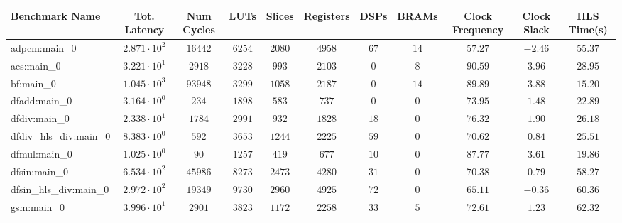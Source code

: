 \begin{tabular}{|l|c|c|c|c|c|c|c|c|c|c|}
\hline
Benchmark Name          & Tot. Latency           & Num Cycles & LUTs      & Slices    & Registers & DSPs    & BRAMs   & Clock Frequency & Clock Slack & HLS Time(s) \\
\hline
adpcm:main\_0           & $ 2.871 \cdot 10^{2} $ & $ 16442  $ & $ 6254  $ & $ 2080  $ & $ 4958  $ & $ 67  $ & $ 14  $ & $ 57.27       $ & $ -2.46   $ & $ 55.37   $ \\
aes:main\_0             & $ 3.221 \cdot 10^{1} $ & $ 2918   $ & $ 3228  $ & $ 993   $ & $ 2103  $ & $ 0   $ & $ 8   $ & $ 90.59       $ & $ 3.96    $ & $ 28.95   $ \\
bf:main\_0              & $ 1.045 \cdot 10^{3} $ & $ 93948  $ & $ 3299  $ & $ 1058  $ & $ 2187  $ & $ 0   $ & $ 14  $ & $ 89.89       $ & $ 3.88    $ & $ 15.20   $ \\
dfadd:main\_0           & $ 3.164 \cdot 10^{0} $ & $ 234    $ & $ 1898  $ & $ 583   $ & $ 737   $ & $ 0   $ & $ 0   $ & $ 73.95       $ & $ 1.48    $ & $ 22.89   $ \\
dfdiv:main\_0           & $ 2.338 \cdot 10^{1} $ & $ 1784   $ & $ 2991  $ & $ 932   $ & $ 1828  $ & $ 18  $ & $ 0   $ & $ 76.32       $ & $ 1.90    $ & $ 26.18   $ \\
dfdiv\_hls\_div:main\_0 & $ 8.383 \cdot 10^{0} $ & $ 592    $ & $ 3653  $ & $ 1244  $ & $ 2225  $ & $ 59  $ & $ 0   $ & $ 70.62       $ & $ 0.84    $ & $ 25.51   $ \\
dfmul:main\_0           & $ 1.025 \cdot 10^{0} $ & $ 90     $ & $ 1257  $ & $ 419   $ & $ 677   $ & $ 10  $ & $ 0   $ & $ 87.77       $ & $ 3.61    $ & $ 19.86   $ \\
dfsin:main\_0           & $ 6.534 \cdot 10^{2} $ & $ 45986  $ & $ 8273  $ & $ 2473  $ & $ 4280  $ & $ 31  $ & $ 0   $ & $ 70.38       $ & $ 0.79    $ & $ 58.27   $ \\
dfsin\_hls\_div:main\_0 & $ 2.972 \cdot 10^{2} $ & $ 19349  $ & $ 9730  $ & $ 2960  $ & $ 4925  $ & $ 72  $ & $ 0   $ & $ 65.11       $ & $ -0.36   $ & $ 60.36   $ \\
gsm:main\_0             & $ 3.996 \cdot 10^{1} $ & $ 2901   $ & $ 3823  $ & $ 1172  $ & $ 2258  $ & $ 33  $ & $ 5   $ & $ 72.61       $ & $ 1.23    $ & $ 62.32   $ \\

\end{tabular}
